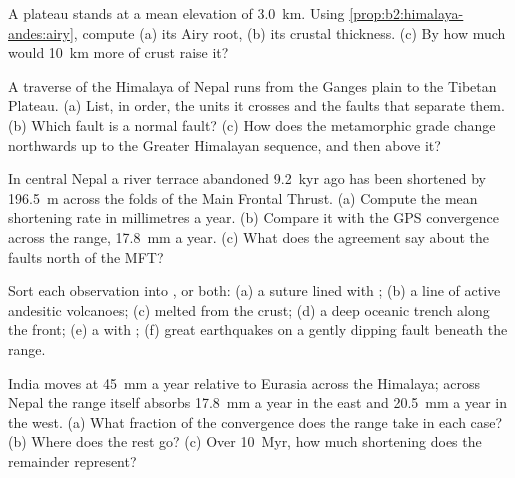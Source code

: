 \begin{exercise}[$\star$]\label{exo:b2:himalaya-andes:1}
A plateau stands at a mean elevation of \qty{3.0}{km}. Using
\cref{prop:b2:himalaya-andes:airy}, compute (a) its Airy root, (b) its crustal thickness.
(c) By how much would \qty{10}{km} more of crust raise it?
\end{exercise}

\begin{exercise}[$\star$]\label{exo:b2:himalaya-andes:2}
A traverse of the Himalaya of Nepal runs from the Ganges plain to the Tibetan Plateau.
(a) List, in order, the units it crosses and the faults that separate them. (b) Which fault
is a normal fault? (c) How does the metamorphic grade change northwards up to the Greater
Himalayan sequence, and then above it?
\end{exercise}

\begin{exercise}[$\star$]\label{exo:b2:himalaya-andes:3}
In central Nepal a river terrace abandoned \qty{9.2}{kyr} ago has been shortened by
\qty{196.5}{m} across the folds of the Main Frontal Thrust. (a) Compute the mean shortening
rate in millimetres a year. (b) Compare it with the GPS convergence across the range,
\qty{17.8}{mm} a year. (c) What does the agreement say about the faults north of the MFT?
\end{exercise}

\begin{exercise}[$\star$]\label{exo:b2:himalaya-andes:4}
Sort each observation into ,  or both: (a) a suture lined
with ; (b) a line of active andesitic volcanoes; (c)  melted from the
crust; (d) a deep oceanic trench along the front; (e) a  with ;
(f) great earthquakes on a gently dipping fault beneath the range.
\end{exercise}

\begin{exercise}[$\star\star$]\label{exo:b2:himalaya-andes:5}
India moves at \qty{45}{mm} a year relative to Eurasia across the Himalaya; across Nepal the
range itself absorbs \qty{17.8}{mm} a year in the east and \qty{20.5}{mm} a year in the west.
(a) What fraction of the convergence does the range take in each case? (b) Where does the
rest go? (c) Over \qty{10}{Myr}, how much shortening does the remainder represent?
\end{exercise}


